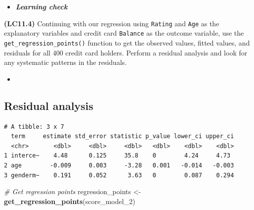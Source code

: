 \documentclass[12pt, krantz2,]{krantz}
\makeatletter
\newenvironment{Shaded}{\begin{snugshade}}{\end{snugshade}}
\newcommand{\CommentTok}[1]{\textcolor[rgb]{0.37,0.37,0.37}{\textit{#1}}}
\newcommand{\DataTypeTok}[1]{\textcolor[rgb]{0.27,0.27,0.27}{#1}}
\newcommand{\DecValTok}[1]{\textcolor[rgb]{0.06,0.06,0.06}{#1}}
\newcommand{\KeywordTok}[1]{\textcolor[rgb]{0.27,0.27,0.27}{\textbf{#1}}}
\newcommand{\NormalTok}[1]{#1}
\newcommand{\OperatorTok}[1]{\textcolor[rgb]{0.43,0.43,0.43}{\textbf{#1}}}
\newcommand{\StringTok}[1]{\textcolor[rgb]{0.5,0.5,0.5}{#1}}
\newenvironment{kframe}{%
\medskip{}
\setlength{\fboxsep}{.8em}
 \def\at@end@of@kframe{}%
 \ifinner\ifhmode%
  \def\at@end@of@kframe{\end{minipage}}%
  \begin{minipage}{\columnwidth}%
 \fi\fi%
 \def\FrameCommand##1{\hskip\@totalleftmargin \hskip-\fboxsep
 \colorbox{shadecolor}{##1}\hskip-\fboxsep
     \hskip-\linewidth \hskip-\@totalleftmargin \hskip\columnwidth}%
 \MakeFramed {\advance\hsize-\width
   \@totalleftmargin\z@ \linewidth\hsize
   \@setminipage}}%
 {\par\unskip\endMakeFramed%
 \at@end@of@kframe}
\renewenvironment{Shaded}{\begin{kframe}}{\end{kframe}}
\newenvironment{rmdblock}[1]
  {\begin{shaded*}
  \begin{itemize}
  \renewcommand{\labelitemi}{
    \raisebox{-.7\height}[0pt][0pt]{
    }
  }
  \item
  }
  {
  \end{itemize}
  \end{shaded*}
  }
\newenvironment{learncheck}
  {\begin{rmdblock}{warning}}
  {\end{rmdblock}}
\makeatother
\begin{document}
\begin{learncheck}
\textbf{\emph{Learning check}}
\end{learncheck}

\textbf{(LC11.4)} Continuing with our regression using \texttt{Rating} and \texttt{Age} as the explanatory variables and credit card \texttt{Balance} as the outcome variable, use the \texttt{get\_regression\_points()} function to get the observed values, fitted values, and residuals for all 400 credit card holders. Perform a residual analysis and look for any systematic patterns in the residuals.

\begin{learncheck}

\end{learncheck}

\hypertarget{model4residuals}{%
\subsection{Residual analysis}\label{model4residuals}}

\begin{Shaded}
\end{Shaded}

\begin{verbatim}
# A tibble: 3 x 7
  term     estimate std_error statistic p_value lower_ci upper_ci
  <chr>       <dbl>     <dbl>     <dbl>   <dbl>    <dbl>    <dbl>
1 interce~    4.48      0.125     35.8    0        4.24     4.73 
2 age        -0.009     0.003     -3.28   0.001   -0.014   -0.003
3 genderm~    0.191     0.052      3.63   0        0.087    0.294
\end{verbatim}

\begin{Shaded}
\begin{Highlighting}[]
\CommentTok{# Get regression points}
\NormalTok{regression_points <-}\StringTok{ }\KeywordTok{get_regression_points}\NormalTok{(score_model_}\DecValTok{2}\NormalTok{)}
\end{Highlighting}
\end{Shaded}
\end{document}
